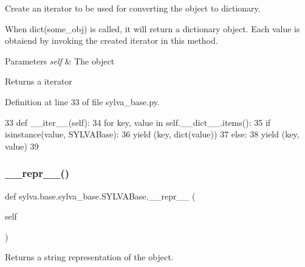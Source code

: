 Create an iterator to be used for converting the object to dictionary. 

When dict(some\+\_\+obj) is called, it will return a dictionary object. Each value is obtaiend by invoking the created iterator in this method.


\begin{DoxyParams}{Parameters}
{\em self} & The object\\
\hline
\end{DoxyParams}
\begin{DoxyReturn}{Returns}
a iterator 
\end{DoxyReturn}


Definition at line 33 of file sylva\+\_\+base.\+py.


\begin{DoxyCode}
33     \textcolor{keyword}{def }\_\_iter\_\_(self):
34         \textcolor{keywordflow}{for} key, value \textcolor{keywordflow}{in} self.\_\_dict\_\_.items():
35             \textcolor{keywordflow}{if} isinstance(value, SYLVABase):
36                 \textcolor{keywordflow}{yield} (key, dict(value))
37             \textcolor{keywordflow}{else}:
38                 \textcolor{keywordflow}{yield} (key, value)
39 
\end{DoxyCode}
\mbox{\label{classsylva_1_1base_1_1sylva__base_1_1_s_y_l_v_a_base_a5bd08c41ab09c380433d0de82fb98860}} 
\subsubsection{\texorpdfstring{\+\_\+\+\_\+repr\+\_\+\+\_\+()}{\_\_repr\_\_()}}
{\footnotesize\ttfamily def sylva.\+base.\+sylva\+\_\+base.\+S\+Y\+L\+V\+A\+Base.\+\_\+\+\_\+repr\+\_\+\+\_\+ (\begin{DoxyParamCaption}\item[{}]{self }\end{DoxyParamCaption})\hspace{0.3cm}{\ttfamily [inherited]}}



Returns a string representation of the object. 

